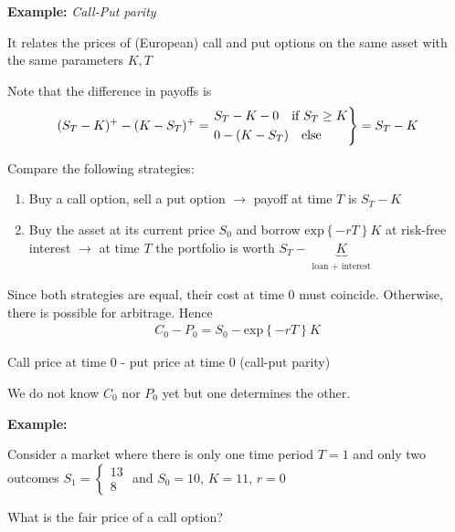 \par\bigskip
\noindent\textbf{Example:} \textit{Call-Put parity}\par
\noindent It relates the prices of (European) call and put options on the same asset with the same parameters $K,T$\par
\noindent Note that the difference in payoffs is 
\begin{equation*}
  \begin{gathered}
    (S_T-K)^+ -(K-S_T)^+ = \begin{rcases}
      S_T-K-0\quad\text{if } S_T\geq K\\
      0-(K-S_T)\quad\text{else}
    \end{rcases} = S_T-K
  \end{gathered}
\end{equation*}
\par\bigskip
\noindent Compare the following strategies:\par
\begin{enumerate}[leftmargin=*]
  \item Buy a call option, sell a put option $\rightarrow$ payoff at time $T$ is $S_T-K$
  \item Buy the asset at its current price $S_0$ and borrow $\text{exp}\left\{-rT\right\}K$ at risk-free interest $\rightarrow$ at time $T$ the portfolio is worth $S_T-\underbrace{K}_{\substack{\text{loan + interest}}}$
\end{enumerate}
\par\bigskip
\noindent Since both strategies are equal, their cost at time 0 must coincide. Otherwise, there is possible for arbitrage. Hence
\begin{equation*}
  \begin{gathered}
    C_0-P_0 = S_0-\text{exp}\left\{-rT\right\}K
  \end{gathered}
\end{equation*}\par
\noindent Call price at time 0 - put price at time 0 (call-put parity)
\par\bigskip
\noindent We do not know $C_0$ nor $P_0$ yet but one determines the other.
\par\bigskip
\noindent\textbf{Example:}\par
\noindent Consider a market where there is only one time period $T=1$ and only two outcomes $S_1= \begin{cases}
  13\\8
\end{cases}$ and $S_0=10$, $K=11$, $r=0$\par
\noindent What is the fair price of a call option?\par

